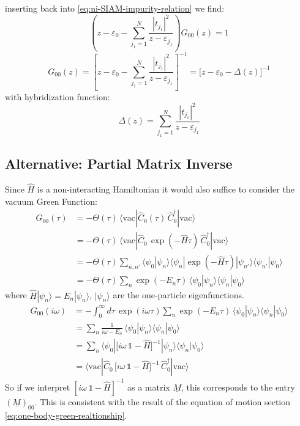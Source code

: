 inserting back into \eqref{eq:ni-SIAM-impurity-relation} we find:
\begin{equation*}
    \left( z - \varepsilon_0 - \sum_{j_1 = 1}^{N} \frac{|t_{j_1}|^2}{z - \varepsilon_{j_1}} \right) G_{00}(z) = 1
\end{equation*}
\begin{equation}
    \boxed{\, G_{00}(z) = \left[ z - \varepsilon_0 - \sum_{j_1 = 1}^{N} \frac{|t_{j_1}|^2}{z - \varepsilon_{j_1}} \right]^{-1} = \big[ z - \varepsilon_0 - \Delta(z) \big]^{-1} \,} \label{eq:ni-SIAM-green-function}
\end{equation}
with hybridization function:
\begin{equation}
    \boxed{\Delta(z) = \sum_{j_1 = 1}^{N} \frac{|t_{j_1}|^2}{z - \varepsilon_{j_1}}} \label{eq:hybridization}
\end{equation}

\subsection*{Alternative: Partial Matrix Inverse}

Since $\hat{H}$ is a non-interacting Hamiltonian it would also suffice to consider the vacuum Green Function:
\begin{align*}
    G_{00}(\tau) &= -\Theta(\tau)\, \langle \text{vac} | \hat{C}_0(\tau)\, \hat{C}_0^{\dagger} | \text{vac} \rangle \\
    &= -\Theta(\tau)\, \langle \text{vac} | \hat{C}_0\, \exp(-\hat{H}\tau)\, \hat{C}_0^{\dagger} | \text{vac} \rangle \\
    &= -\Theta(\tau) \sum_{n,n'} \langle \psi_0 | \psi_n \rangle\langle \psi_n | \exp(-\hat{H}\tau) |\psi_{n'}\rangle\langle\psi_{n'}| \psi_0 \rangle \\
    &= -\Theta(\tau) \sum_n \exp(-E_n \tau)\, \langle \psi_0 | \psi_n \rangle\langle \psi_n | \psi_0 \rangle
\end{align*}
where $\hat{H}|\psi_n\rangle = E_n|\psi_n\rangle$, $|\psi_n\rangle$ are the one-particle eigenfunctions.
\begin{align*}
    G_{00}(i\omega) &= -\int_0^{\infty} d\tau\, \exp(i\omega\tau) \sum_n \exp(-E_n \tau)\, \langle \psi_0 |\psi_n\rangle\langle\psi_n| \psi_0 \rangle \\
    &= \sum_n \frac{1}{i\omega - E_n}\, \langle \psi_0 |\psi_n\rangle\langle\psi_n| \psi_0 \rangle \\
    &= \sum_n \langle \psi_0 | \big[ i\omega\,\mathbb{1} - \hat{H} \big]^{-1} |\psi_n\rangle\langle\psi_n| \psi_0 \rangle \\
    &= \langle \text{vac} | \hat{C}_0\, \big[ i\omega\,\mathbb{1} - \hat{H} \big]^{-1}\, \hat{C}_0^{\dagger} | \text{vac} \rangle
\end{align*}
So if we interpret $[i\omega\,\mathbb{1} - \hat{H}]^{-1}$ as a matrix $\underline{M}$, this corresponds to the entry $(\underline{M})_{00}$.
This is consistent with the result of the equation of motion section \eqref{eq:one-body-green-realtionship}.

